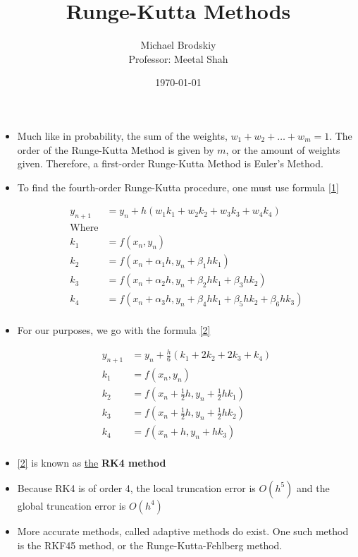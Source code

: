 \documentclass[12pt]{article}
\title{Runge-Kutta Methods}
\date{\today}
\author{Michael Brodskiy\\ \small Professor: Meetal Shah}
\begin{document}
\maketitle

\begin{itemize}

  \item Much like in probability, the sum of the weights, $w_1+w_2+\dots+w_m=1$. The order of the Runge-Kutta Method is given by $m$, or the amount of weights given. Therefore, a first-order Runge-Kutta Method is Euler's Method.

  \item To find the fourth-order Runge-Kutta procedure, one must use formula \eqref{1}

    \begin{equation}
      \begin{split}
        y_{n+1}&=y_n+h(w_1k_1+w_2k_2+w_3k_3+w_4k_4)\\
        \text{Where}&\\
        k_1&=f(x_n,y_n)\\
        k_2&=f(x_n+\alpha_1h,y_n+\beta_1hk_1)\\
        k_3&=f(x_n+\alpha_2h,y_n+\beta_2hk_1+\beta_3hk_2)\\
        k_4&=f(x_n+\alpha_3h,y_n+\beta_4hk_1+\beta_5hk_2+\beta_6hk_3)\\
      \end{split}
      \label{1}
    \end{equation}

  \item For our purposes, we go with the formula \eqref{2}

    \begin{equation}
      \begin{split}
        y_{n+1}&=y_n+\frac{h}{6}(k_1+2k_2+2k_3+k_4)\\
        k_1&=f(x_n,y_n)\\
        k_2&=f(x_n+\frac{1}{2}h,y_n+\frac{1}{2}hk_1)\\
        k_3&=f(x_n+\frac{1}{2}h,y_n+\frac{1}{2}hk_2)\\
        k_4&=f(x_n+h,y_n+hk_3)\\
      \end{split}
      \label{2}
    \end{equation}

  \item \eqref{2} is known as \underline{the} \textbf{RK4 method} 

  \item Because RK4 is of order 4, the local truncation error is $O(h^5)$ and the global truncation error is $O(h^4)$

  \item More accurate methods, called adaptive methods do exist. One such method is the RKF45 method, or the Runge-Kutta-Fehlberg method. 

\end{itemize}
\end{document}
